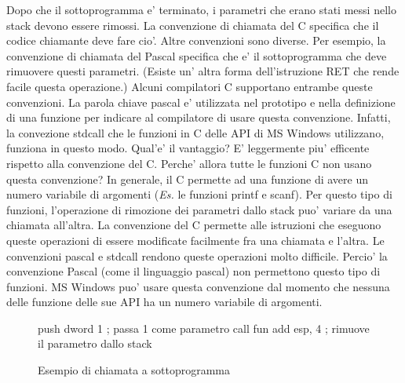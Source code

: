 Dopo che il sottoprogramma e' terminato, i parametri che erano stati messi
nello stack devono essere rimossi. La convenzione di chiamata del C
 specifica che il codice chiamante deve
fare cio'. Altre convenzioni sono diverse. Per esempio, la convenzione di
chiamata del Pascal specifica che
e' il sottoprogramma che deve rimuovere questi parametri. (Esiste un'
altra forma dell'istruzione RET  che rende facile questa 
operazione.) Alcuni compilatori C supportano entrambe queste convenzioni.
La parola chiave {\code pascal} e' utilizzata nel prototipo e nella
definizione di una funzione per indicare al compilatore di usare questa
convenzione. Infatti, la convezione {\code stdcall}  che le funzioni in C delle API di MS Windows utilizzano,
funziona in questo modo. Qual'e' il vantaggio? E' leggermente piu'
efficente rispetto alla convenzione del C. Perche' allora tutte le funzioni
C non usano questa convenzione? In generale, il C permette ad una funzione
di avere un numero variabile di argomenti (\emph{Es.} le funzioni {\code printf}
e {\code scanf}). Per questo tipo di funzioni, l'operazione di rimozione
dei parametri dallo stack puo' variare da una chiamata all'altra. La 
convenzione del C permette alle istruzioni che eseguono queste operazioni
di essere modificate facilmente fra una chiamata e l'altra. Le convenzioni
pascal e stdcall rendono queste operazioni molto difficile. Percio'
la convenzione Pascal (come il linguaggio pascal) non permettono questo
tipo di funzioni. MS Windows puo' usare questa convenzione dal momento
che nessuna delle funzione delle sue API ha un numero variabile di
argomenti.

\begin{figure}[t]
\begin{AsmCodeListing}[frame=single]
      push   dword 1        ; passa 1 come parametro
      call   fun
      add    esp, 4         ; rimuove il parametro dallo stack
\end{AsmCodeListing}
\caption{Esempio di chiamata a sottoprogramma \label{fig:subcall}}
\end{figure}

